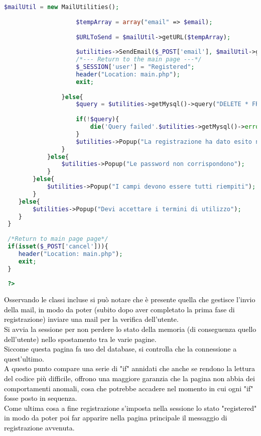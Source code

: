 \begin{lstlisting}[language=php]
 					$mailUtil = new MailUtilities();
 					
 					$tempArray = array("email" => $email);
 					
 					$URLToSend = $mailUtil->getURL($tempArray);
 					
 					$utilities->SendEmail($_POST['email'], $mailUtil->getSubject(), $mailUtil->getBody($URLToSend), $mailUtil->getAlternativeBody($URLToSend));
 					/*--- Return to the main page ---*/
 					$_SESSION['user'] = "Registered";
 					header("Location: main.php");
 					exit;
 					
 				}else{
 					$query = $utilities->getMysql()->query("DELETE * FROM usert_table1 WHERE (email = '{$email}')");
 					
 					if(!$query){
 						die('Query failed'.$utilities->getMysql()->error);
 					} 
					$utilities->Popup("La registrazione ha dato esito negativo");
 				}
 			}else{
 				$utilities->Popup("Le password non corrispondono");
 			}
 		}else{
 			$utilities->Popup("I campi devono essere tutti riempiti");
 		}
 	}else{
 		$utilities->Popup("Devi accettare i termini di utilizzo");
 	}
 }
 
 /*Return to main page page*/
 if(isset($_POST['cancel'])){
 	header("Location: main.php");
 	exit;
 }
 
 ?>
 \end{lstlisting}
 
 \textcolor{black}{Osservando le classi incluse si può notare che è presente quella che gestisce l'invio della mail, in modo da poter (subito dopo aver completato la prima fase di registrazione) inviare una mail per la verifica dell'utente.\\
 Si avvia la sessione per non perdere lo stato della memoria (di conseguenza quello dell'utente) nello spostamento tra le varie pagine.\\
 Siccome questa pagina fa uso del database, si controlla che la connessione a quest'ultimo.\\
 A questo punto compare una serie di "if" annidati che anche se rendono la lettura del codice più difficile, offrono una maggiore garanzia che la pagina non abbia dei comportamenti anomali, cosa che potrebbe accadere nel momento in cui ogni "if" fosse posto in sequenza.\\
 Come ultima cosa a fine registrazione s'imposta nella sessione lo stato "registered" in modo da poter poi far apparire nella pagina principale il messaggio di registrazione avvenuta.}\\
 
